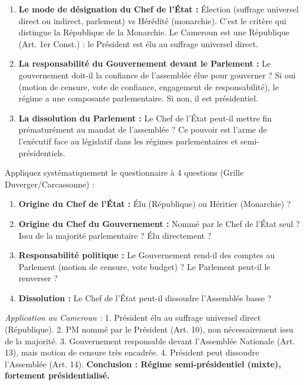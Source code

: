 \documentclass[11pt]{article}
\newcommand{\cle}[1]{{\popxbold\color{popdark}#1}}
\begin{document}
\begin{enumerate}
    \item \textbf{Le mode de désignation du Chef de l'État :} Élection (suffrage universel direct ou indirect, parlement) vs Hérédité (monarchie). C'est le critère qui distingue la \cle{République} de la \cle{Monarchie}. Le Cameroun est une République (Art. 1er Const.) : le Président est élu au suffrage universel direct.
    \item \textbf{La responsabilité du Gouvernement devant le Parlement :} Le gouvernement doit-il la confiance de l'assemblée élue pour gouverner ? Si oui (motion de censure, vote de confiance, engagement de responsabilité), le régime a une composante \cle{parlementaire}. Si non, il est \cle{présidentiel}.
    \item \textbf{La dissolution du Parlement :} Le Chef de l'État peut-il mettre fin prématurément au mandat de l'assemblée ? Ce pouvoir est l'arme de l'exécutif face au législatif dans les régimes parlementaires et semi-présidentiels.
\end{enumerate}

\begin{methode}
Appliquez systématiquement le questionnaire à 4 questions (Grille Duverger/Carcassonne) :
\begin{enumerate}
    \item \textbf{Origine du Chef de l'État :} Élu (République) ou Héritier (Monarchie) ?
    \item \textbf{Origine du Chef du Gouvernement :} Nommé par le Chef de l'État seul ? Issu de la majorité parlementaire ? Élu directement ?
    \item \textbf{Responsabilité politique :} Le Gouvernement rend-il des comptes au Parlement (motion de censure, vote budget) ? Le Parlement peut-il le renverser ?
    \item \textbf{Dissolution :} Le Chef de l'État peut-il dissoudre l'Assemblée basse ?
\end{enumerate}
\emph{Application au Cameroun :} 1. Président élu au suffrage universel direct (République). 2. PM nommé par le Président (Art. 10), non nécessairement issu de la majorité. 3. Gouvernement responsable devant l'Assemblée Nationale (Art. 13), mais motion de censure très encadrée. 4. Président peut dissoudre l'Assemblée (Art. 14). \textbf{Conclusion : Régime semi-présidentiel (mixte), fortement présidentialisé.}
\end{methode}
\end{document}
